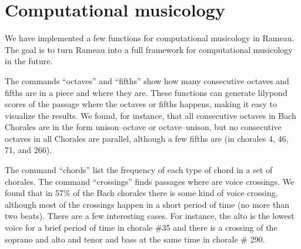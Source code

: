 \section{Computational musicology}
\label{sec:comp-music}

We have implemented a few functions for computational musicology in
Rameau. The goal is to turn Rameau into a full framework for
computational musicology in the future.

The commands ``octaves'' and ``fifths'' show how many consecutive
octaves and fifths are in a piece and where they are. These functions
can generate lilypond scores of the passage where the octaves or
fifths happens, making it easy to visualize the results. We found, for
instance, that all consecutive octaves in Bach Chorales are in the
form unison--octave or octave--unison, but no consecutive octaves in all
Chorales are parallel, although a few fifths are (in chorales 4, 46,
71, and 266).


The command ``chords'' list the frequency of each type of chord in a
set of chorales. %
The command ``crossings'' finds passages where are voice crossings. We
found that in 57\% of the Bach chorales there is some kind of voice
crossing, although most of the crossings happen in a short period of
time (no more than two beats). There are a few interesting cases. For
instance, the alto is the lowest voice for a brief period of time in
chorale \#35 and there is a crossing of the soprano and alto and tenor
and bass at the same time in chorale \# 290.

